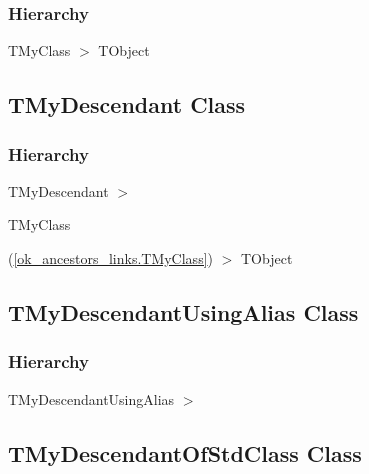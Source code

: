 \documentclass{report}
\newif\ifpdf
\begin{document}
\subsubsection*{\large{\textbf{Hierarchy}}\normalsize\hspace{1ex}\hfill}
TMyClass {$>$} TObject
\ifpdf
\subsection*{\large{\textbf{TMyDescendant Class}}\normalsize\hspace{1ex}\hrulefill}
\else
\subsection*{TMyDescendant Class}
\fi
\label{ok_ancestors_links.TMyDescendant}
\subsubsection*{\large{\textbf{Hierarchy}}\normalsize\hspace{1ex}\hfill}
TMyDescendant {$>$} \begin{ttfamily}TMyClass\end{ttfamily}(\ref{ok_ancestors_links.TMyClass}) {$>$} 
TObject
\ifpdf
\subsection*{\large{\textbf{TMyDescendantUsingAlias Class}}\normalsize\hspace{1ex}\hrulefill}
\else
\subsection*{TMyDescendantUsingAlias Class}
\fi
\label{ok_ancestors_links.TMyDescendantUsingAlias}
\subsubsection*{\large{\textbf{Hierarchy}}\normalsize\hspace{1ex}\hfill}
TMyDescendantUsingAlias {$>$} %
\ifpdf
\subsection*{\large{\textbf{TMyDescendantOfStdClass Class}}\normalsize\hspace{1ex}\hrulefill}
\else
\subsection*{TMyDescendantOfStdClass Class}
\fi
\label{ok_ancestors_links.TMyDescendantOfStdClass}
\end{document}
